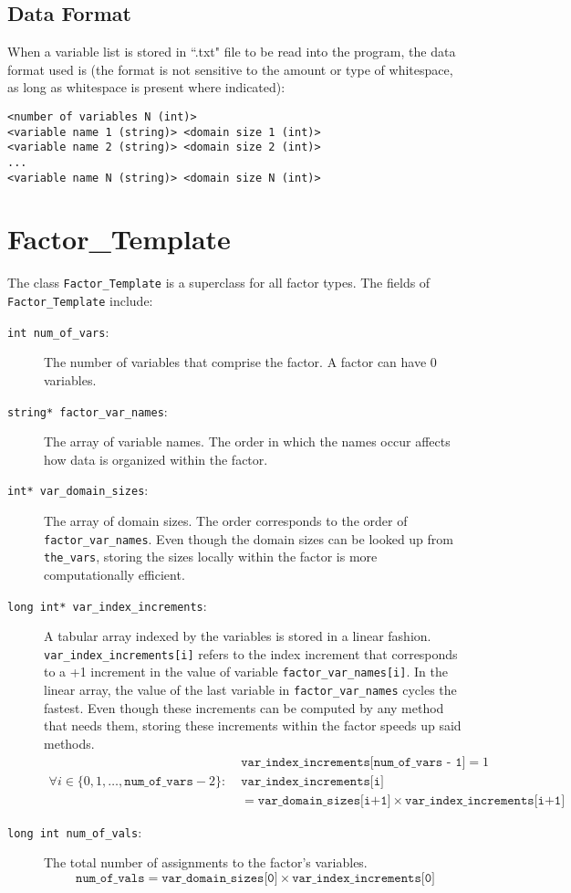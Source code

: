 \documentclass{article}
\begin{document}
\subsection{Data Format}
When a variable list is stored in ``.txt" file to be read into the program, the data format used is (the format is not sensitive to the amount or type of whitespace, as long as whitespace is present where indicated): 
\begin{verbatim}
<number of variables N (int)>
<variable name 1 (string)> <domain size 1 (int)>
<variable name 2 (string)> <domain size 2 (int)>
...
<variable name N (string)> <domain size N (int)>
\end{verbatim}




\section{Factor\_Template}

The class \texttt{Factor\_Template} is a superclass for all factor types. The fields of \texttt{Factor\_Template} include:       

\begin{description}
\item[\texttt{int num\_of\_vars}:] The number of variables that comprise the factor. A factor can have 0 variables.

\item[\texttt{string* factor\_var\_names}:] The array of variable names. The order in which the names occur affects how data is organized within the factor.

\item[\texttt{int* var\_domain\_sizes}:] The array of domain sizes. The order corresponds to the order of \texttt{factor\_var\_names}. Even though the domain sizes can be looked up from \texttt{the\_vars}, storing the sizes locally within the factor is more computationally efficient.

\item[\texttt{long int* var\_index\_increments}:] A tabular array indexed by the variables is stored in a linear fashion. \texttt{var\_index\_increments[i]} refers to the index increment that corresponds to a +1 increment in the value of variable \texttt{factor\_var\_names[i]}. In the linear array, the value of the last variable in \texttt{factor\_var\_names} cycles the fastest. Even though these increments can be computed by any method that needs them, storing these increments within the factor speeds up said methods. 
\begin{align*}
& \texttt{var\_index\_increments[num\_of\_vars - 1]} = 1 \\
\forall i \in \{0, 1, \dots, \texttt{num\_of\_vars} - 2\}:\; & \texttt{var\_index\_increments[i]} \\
& = \texttt{var\_domain\_sizes[i+1]} \times \texttt{var\_index\_increments[i+1]}
\end{align*}
\item[\texttt{long int num\_of\_vals}:] The total number of assignments to the factor's variables. \[\texttt{num\_of\_vals} = \texttt{var\_domain\_sizes[0]} \times \texttt{var\_index\_increments[0]}\]
\end{description}
\end{document}
